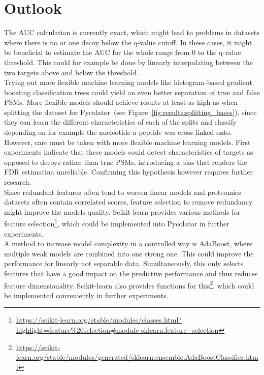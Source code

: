 \section{Outlook}
\label{outlook}
The AUC calculation is currently exact, which might lead to problems in datasets where there is no or one decoy below the q-value cutoff. In these cases, it might be beneficial to estimate the AUC for the whole range from $0$ to the q-value threshold. This could for example be done by linearly interpolating between the two targets above and below the threshold.\\
Trying out more flexible machine learning models like histogram-based gradient boosting classification trees could yield an even better separation of true and false PSMs. More flexible models should achieve results at least as high as when splitting the dataset for Pycolator~(see Figure~\ref{fig:results:splitting_bases}), since they can learn the different characteristics of each of the splits and classify depending on for example the nucleotide a peptide was cross-linked onto. However, care must be taken with more flexible machine learning models. First experiments indicate that these models could detect characteristics of targets as opposed to decoys rather than true PSMs, introducing a bias that renders the FDR estimation unreliable. Confirming this hypothesis however requires further research.\\
Since redundant features often tend to worsen linear models and proteomics datasets often contain correlated scores, feature selection to remove redundancy might improve the models quality. Scikit-learn provides various methods for feature selection\footnote{\url{https://scikit-learn.org/stable/modules/classes.html?highlight=feature\%20selection\#module-sklearn.feature_selection}}, which could be implemented into Pycolator in further experiments.\\
A method to increase model complexity in a controlled way is AdaBoost, where multiple weak models are combined into one strong one. This could improve the performance for linearly not separable data. Simultaneously, this only selects features that have a good impact on the predictive performance and thus reduces feature dimensionality. Scikit-learn also provides functions for this\footnote{\url{https://scikit-learn.org/stable/modules/generated/sklearn.ensemble.AdaBoostClassifier.html}}, which could be implemented conveniently in further experiments.